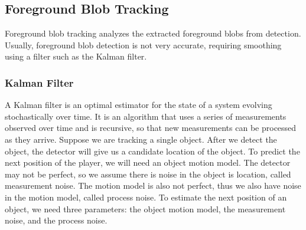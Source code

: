 \subsection{Foreground Blob Tracking}
Foreground blob tracking analyzes the extracted foreground blobs from detection. Usually, foreground blob detection is not very accurate, requiring smoothing using a filter such as the Kalman filter.

\subsubsection{Kalman Filter}
A Kalman filter is an optimal estimator for the state of a system evolving stochastically over time. It is an algorithm that uses a series of measurements observed over time and is recursive, so that new measurements can be processed as they arrive. Suppose we are tracking a single object. After we detect the object, the detector will give us a candidate location of the object. To predict the next position of the player, we will need an object motion model. The detector may not be perfect, so  we assume there is noise in the object is location, called measurement noise. The motion model is also not perfect, thus we also have noise in the motion model, called process noise. To estimate the next position of an object, we need three parameters: the object motion model, the measurement noise, and the process noise.  

\FloatBarrier

